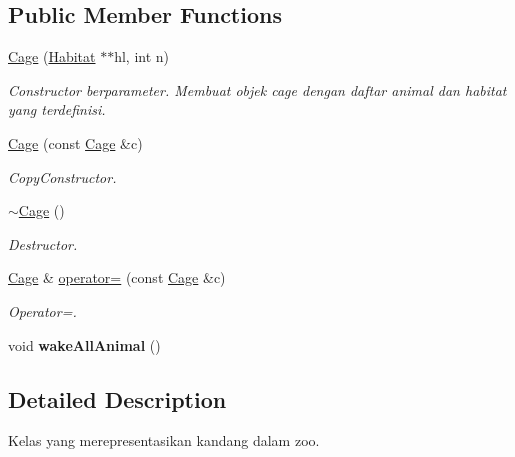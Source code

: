 \subsection*{Public Member Functions}
\begin{DoxyCompactItemize}
\item 
\hyperlink{classCage_a87cfc71acde51257611ce288e6337363}{Cage} (\hyperlink{classHabitat}{Habitat} $\ast$$\ast$hl, int n)
\begin{DoxyCompactList}\small\item\em Constructor berparameter. Membuat objek cage dengan daftar animal dan habitat yang terdefinisi. \end{DoxyCompactList}\item 
\hyperlink{classCage_ae85bb53517616422bf7f36282de01519}{Cage} (const \hyperlink{classCage}{Cage} \&c)\hypertarget{classCage_ae85bb53517616422bf7f36282de01519}{}\label{classCage_ae85bb53517616422bf7f36282de01519}

\begin{DoxyCompactList}\small\item\em Copy\+Constructor. \end{DoxyCompactList}\item 
\hyperlink{classCage_a657259499dfc23c63fc65aeaf8abbb17}{$\sim$\+Cage} ()\hypertarget{classCage_a657259499dfc23c63fc65aeaf8abbb17}{}\label{classCage_a657259499dfc23c63fc65aeaf8abbb17}

\begin{DoxyCompactList}\small\item\em Destructor. \end{DoxyCompactList}\item 
\hyperlink{classCage}{Cage} \& \hyperlink{classCage_a020eefd2b5d15915cf65693413be64db}{operator=} (const \hyperlink{classCage}{Cage} \&c)\hypertarget{classCage_a020eefd2b5d15915cf65693413be64db}{}\label{classCage_a020eefd2b5d15915cf65693413be64db}

\begin{DoxyCompactList}\small\item\em Operator=. \end{DoxyCompactList}\item 
void {\bfseries wake\+All\+Animal} ()\hypertarget{classCage_a1f5ebc229af63a1b24f596cf919e3f56}{}\label{classCage_a1f5ebc229af63a1b24f596cf919e3f56}

\end{DoxyCompactItemize}


\subsection{Detailed Description}
Kelas yang merepresentasikan kandang dalam zoo. 

